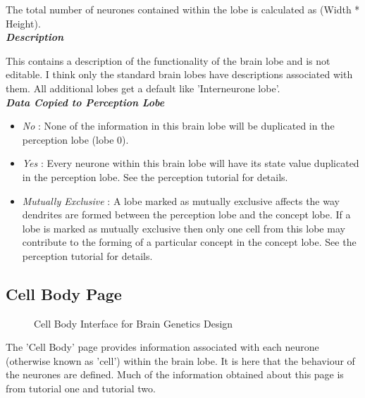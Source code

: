 \documentclass[11pt,twoside,a4paper]{article}
\begin{document}
The total number of neurones contained within the lobe is calculated as (Width * Height).~\\ %

\textbf{\textit{Description}}

This contains a description of the functionality of the brain lobe and is not editable. I think only the standard brain lobes have descriptions associated with them. All additional lobes get a default like 'Interneurone lobe'.~\\

\textbf{\textit{Data Copied to Perception Lobe}}
\begin{itemize}
	\item[] \emph{No} : None of the information in this brain lobe will be duplicated in the perception lobe (lobe 0).
	\item[] \emph{Yes} : Every neurone within this brain lobe will have its state value duplicated in the perception lobe. See the perception tutorial for details.
\item[] \textit{Mutually Exclusive} : A lobe marked as mutually exclusive affects the way dendrites are formed between the perception lobe and the concept lobe. If a lobe is marked as mutually exclusive then only one cell from this lobe may contribute to the forming of a particular concept in the concept lobe. See the perception tutorial for details. 
\end{itemize}

\subsection{Cell Body Page}

\begin{minipage}{0.5\linewidth}
\begin{figure}[H]
	\centerline {} %
	\caption{Cell Body Interface for Brain Genetics Design}
	\label{fig:brain_cellbody}
\end{figure}
\end{minipage}
\begin{minipage}{0.1\linewidth}\end{minipage}
\begin{minipage}{0.4\linewidth}
The 'Cell Body' page provides information associated with each neurone (otherwise known as 'cell') within the brain lobe. It is here that the behaviour of the neurones are defined. Much of the information obtained about this page is from tutorial one and tutorial two.
\end{minipage}~\\
\end{document}
